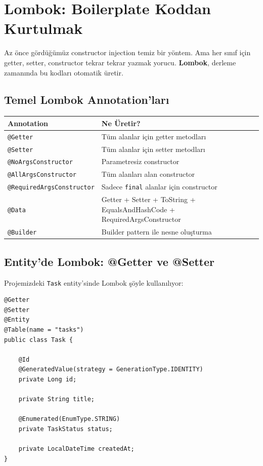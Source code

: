 \documentclass[11pt,a4paper]{article}
\begin{document}
\section{Lombok: Boilerplate Koddan Kurtulmak}

Az \"{o}nce g\"{o}rd\"{u}\u{g}\"{u}m\"{u}z constructor injection temiz bir y\"{o}ntem. Ama her s{\i}n{\i}f i\c{c}in getter, setter, constructor tekrar tekrar yazmak yorucu. \textbf{Lombok}, derleme zaman{\i}nda bu kodlar{\i} otomatik \"{u}retir.

\subsection*{Temel Lombok Annotation'lar{\i}}

\begin{center}
\begin{tabular}{lp{9cm}}
\toprule
\textbf{Annotation} & \textbf{Ne \"{U}retir?} \\
\midrule
\texttt{@Getter} & T\"{u}m alanlar i\c{c}in getter metodlar{\i} \\
\texttt{@Setter} & T\"{u}m alanlar i\c{c}in setter metodlar{\i} \\
\texttt{@NoArgsConstructor} & Parametresiz constructor \\
\texttt{@AllArgsConstructor} & T\"{u}m alanlar{\i} alan constructor \\
\texttt{@RequiredArgsConstructor} & Sadece \texttt{final} alanlar i\c{c}in constructor \\
\texttt{@Data} & Getter + Setter + ToString + EqualsAndHashCode + RequiredArgsConstructor \\
\texttt{@Builder} & Builder pattern ile nesne olu\c{s}turma \\
\bottomrule
\end{tabular}
\end{center}

\subsection*{Entity'de Lombok: @Getter ve @Setter}

Projemizdeki \texttt{Task} entity'sinde Lombok \c{s}\"{o}yle kullan{\i}l{\i}yor:

\begin{lstlisting}[style=java]
@Getter
@Setter
@Entity
@Table(name = "tasks")
public class Task {

    @Id
    @GeneratedValue(strategy = GenerationType.IDENTITY)
    private Long id;

    private String title;

    @Enumerated(EnumType.STRING)
    private TaskStatus status;

    private LocalDateTime createdAt;
}
\end{lstlisting}
\end{document}
